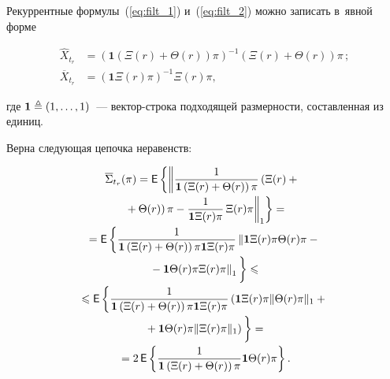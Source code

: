 \begin{multicols}{2}
{ Рекуррентные формулы~(\ref{eq:filt_1}) и~(\ref{eq:filt_2}) можно записать в~явной 
 форме
 
 
\noindent
\begin{align*}
 \widehat{X}_{t_r}& = \left( \mathbf{1}\left(\Xi(r) + 
 \Theta(r)\right)\pi\right)^{-1} \left(\Xi(r) + \Theta(r)\right)\pi\,;
\\
 \overline{X}_{t_r} &= \left( \mathbf{1}\Xi(r)\pi\right)^{-1} \Xi(r) \pi,
\end{align*}

\vspace*{-2pt}

\noindent
где $\mathbf{1} \triangleq (1,\ldots,1)$~--- век\-тор-стро\-ка 
подходящей раз\-мер\-ности, составленная из единиц.

Верна следующая цепочка неравенств:

 \vspace*{-3pt}

\noindent
\begin{multline}
\overline{\Sigma}_{t_r}(\pi)=%
{\sf E}\left\{\left\| 
\fr{1}{\mathbf{1}\left(\Xi(r) + \Theta(r)\right)\pi} \left(\Xi(r) +{}\right.\right.\right.\\[-1pt]
\left.\left.\left.{}+ \Theta(r)\right)\pi
- \fr{1}{\mathbf{1}\Xi(r)\pi}\,\Xi(r) \pi
\right\|_1\right\} ={} \\[-1pt]
{}=
{\sf E}\left\{\fr{1}{\mathbf{1}\left(\Xi(r) + \Theta(r)\right)\pi \mathbf{1}\Xi(r)\pi}
\left\|
 \mathbf{1}\Xi(r) \pi \Theta(r)\pi -{}\right.\right.\\[-1pt]
\left.\left. {}- \mathbf{1}\Theta(r)\pi \Xi(r) \pi
 \right\|_1
 \vphantom{\fr{1}{\mathbf{1}\left(\Xi(r) + \Theta(r)\right)\pi \mathbf{1}\Xi(r)\pi}}
\right\} \leqslant {}\\[-1pt]
{}\leqslant 
{\sf E}\left\{\fr{1}{\mathbf{1}\left(\Xi(r) + \Theta(r)\right)\pi \mathbf{1}\Xi(r)\pi}
\left(
\mathbf{1}\Xi(r)\pi \| \Theta(r)\pi \|_1 +{}\right.\right.\\[-1pt]
\left.\left.{}+ \mathbf{1}\Theta(r)\pi 
\|
\Xi(r) \pi
\|_1
\right)
 \vphantom{\fr{1}{\mathbf{1}\left(\Xi(r) + \Theta(r)\right)\pi \mathbf{1}\Xi(r)\pi}}
\right\} ={}\\[-1pt]
{}=
2\,{\sf E}\left\{\fr{1}{\mathbf{1}\left(\Xi(r) + \Theta(r)\right)\pi}\mathbf{1}\Theta(r)\pi 
\right\}.
\label{eq:ineq_1}
\end{multline}

}
\end{multicols}
